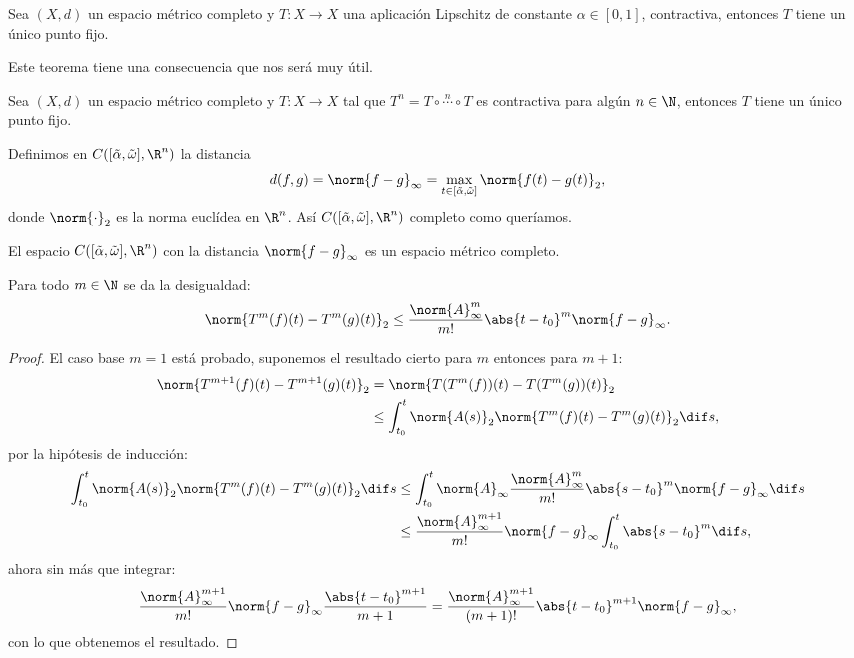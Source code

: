 \documentclass[../main.tex]{subfiles}
\begin{document}
\begin{theorem}
	Sea \((X, d)\) un espacio métrico completo y \(T : X \to X\) una aplicación
	Lipschitz de constante \(\alpha \in [0, 1]\), contractiva, entonces \(T\)
	tiene un único punto fijo.
\end{theorem}

Este teorema tiene una consecuencia que nos será muy útil.

\begin{corollary}
	Sea \((X, d)\) un espacio métrico completo y \(T : X \to X\) tal que 
	\(T^n = T \circ \overset{n}{\cdots} \circ T\) es contractiva para algún
	\(n \in \N\), entonces \(T\) tiene un único punto fijo.
\end{corollary}

Definimos en \(C([\tilde{\alpha}, \tilde{\omega}], \R^n)\) la distancia 
\[d(f, g) = \norm{f - g}_{\infty} = 
	\max_{t \in [\tilde{\alpha}, \tilde{\omega}]} \norm{f(t) - g(t)}_2,\]
donde \(\norm{\cdot}_2\) es la norma euclídea en \(\R^n\). Así 
\(C([\tilde{\alpha}, \tilde{\omega}], \R^n)\) completo como queríamos.

\begin{lemma}
	El espacio \(C([\tilde{\alpha}, \tilde{\omega}], \R^n)\) con la distancia
	\(\norm{f - g}_\infty\) es un espacio métrico completo.
\end{lemma}

\begin{lemma}
\label{lem:desinfty}
	Para todo \(m \in \N\) se da la desigualdad:
	\[\norm{T^m(f)(t) - T^m(g)(t)}_2 \leq 
		\frac{\norm{A}^m_\infty}{m!} \abs{t - t_0}^m \norm{f - g}_\infty.\]
\end{lemma}

\begin{proof}
	El caso base \(m = 1\) está probado, suponemos el resultado cierto para 
	\(m\) entonces para \(m + 1\):
	\begin{align*}
		\norm{T^{m + 1}(f)(t) - T^{m + 1}(g)(t)}_2 
		&= \norm{T(T^m(f))(t) - T(T^m (g))(t)}_2 \\
		&\leq \int_{t_0}^t \norm{A(s)}_2 
			\norm{T^m(f)(t) - T^m (g)(t)}_2 \dif s,
	\end{align*}
	por la hipótesis de inducción:
	\begin{align*}
		\int_{t_0}^t \norm{A(s)}_2 
			\norm{T^m(f)(t) - T^m (g)(t)}_2 \dif s
		&\leq \int_{t_0}^t \norm{A}_\infty 
			\frac{\norm{A}^m_\infty}{m!} \abs{s - t_0}^m 
			\norm{f - g}_\infty \dif s \\
		&\leq \frac{\norm{A}^{m + 1}_\infty}{m!} \norm{f - g}_\infty 
			\int_{t_0}^t \abs{s - t_0}^m \dif s,
	\end{align*}
	ahora sin más que integrar:
	\[
		\frac{\norm{A}^{m + 1}_\infty}{m!} \norm{f - g}_\infty 
			\frac{\abs{t - t_0}^{m + 1}}{m + 1}
		= \frac{\norm{A}^{m + 1}_\infty}{(m + 1)!} \abs{t - t_0}^{m + 1} 
			\norm{f - g}_\infty,
	\]
	con lo que obtenemos el resultado.
\end{proof}
\end{document}
